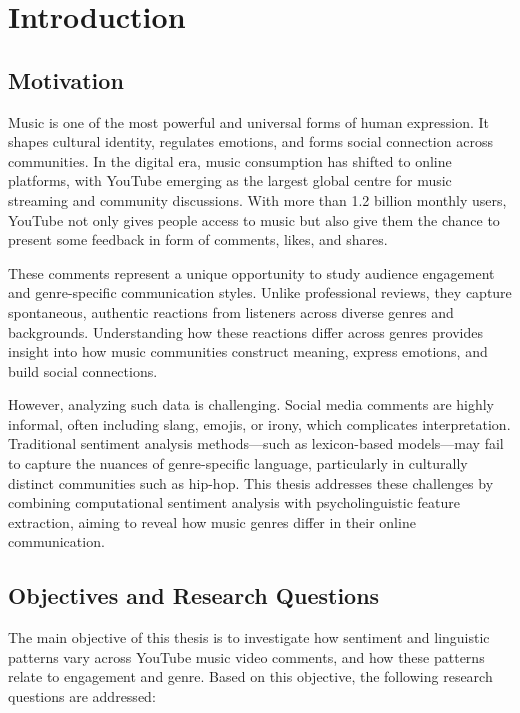 \cleardoubleoddpage
\chapter{Introduction}
\label{sec:introduction}

\section{Motivation}
\label{sec:introduction:motivation}

Music is one of the most powerful and universal forms of human expression. It shapes cultural identity, regulates emotions, and forms social connection across communities. In the digital era, music consumption has shifted to online platforms, with YouTube emerging as the largest global centre for music streaming and community discussions. With more than 1.2 billion monthly users, YouTube not only gives people access to music but also give them the chance to present some feedback in form of comments, likes, and shares. 

These comments represent a unique opportunity to study audience engagement and genre-specific communication styles. Unlike professional reviews, they capture spontaneous, authentic reactions from listeners across diverse genres and backgrounds. Understanding how these reactions differ across genres provides insight into how music communities construct meaning, express emotions, and build social connections.  

However, analyzing such data is challenging. Social media comments are highly informal, often including slang, emojis, or irony, which complicates interpretation. Traditional sentiment analysis methods—such as lexicon-based models—may fail to capture the nuances of genre-specific language, particularly in culturally distinct communities such as hip-hop. This thesis addresses these challenges by combining computational sentiment analysis with psycholinguistic feature extraction, aiming to reveal how music genres differ in their online communication.
\section{Objectives and Research Questions}

The main objective of this thesis is to investigate how sentiment and linguistic patterns vary across YouTube music video comments, and how these patterns relate to engagement and genre.  
Based on this objective, the following research questions are addressed:

